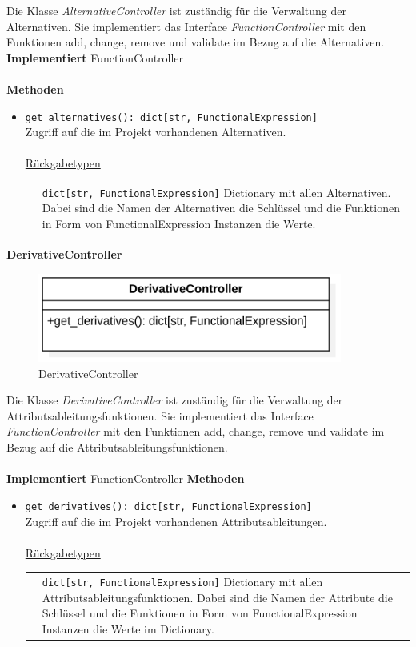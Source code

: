 \documentclass{article}
\begin{document}
Die Klasse \textit{AlternativeController} ist zuständig für die Verwaltung der Alternativen. Sie implementiert das Interface \textit{FunctionController} mit den Funktionen add, change, remove und validate im Bezug auf die Alternativen.
\newline\newline
\textbf{\large{Implementiert}} FunctionController \\\\
\textbf{\large{Methoden}}
\begin{itemize}
\item \texttt{get\_alternatives(): dict[str, FunctionalExpression]}\\ Zugriff auf die im Projekt vorhandenen Alternativen.\\\\
\underline{{Rückgabetypen}}\\
\begin{tabular}{lp{10.7cm}}
 & \texttt{dict[str, FunctionalExpression]}  Dictionary mit allen Alternativen. Dabei sind die Namen der Alternativen die Schlüssel und die Funktionen in Form von FunctionalExpression Instanzen die Werte.\\
\end{tabular}
\end{itemize}


\newpage
\textbf{\large{DerivativeController}}
\begin{figure}[H]%
    \centering
    \includegraphics[width=10cm]{entwurf/Floriane/DerivativeController.png}
    \caption{DerivativeController}
\end{figure}

Die Klasse \textit{DerivativeController} ist zuständig für die Verwaltung der Attributsableitungsfunktionen. Sie implementiert das Interface \textit{FunctionController} mit den Funktionen add, change, remove und validate im Bezug auf die Attributsableitungsfunktionen.\\\\
\textbf{\large{Implementiert}} FunctionController 
\textbf{\large{Methoden}}
\begin{itemize}
\item \texttt{get\_derivatives(): dict[str, FunctionalExpression]}\\ Zugriff auf die im Projekt vorhandenen Attributsableitungen.\\\\
\underline{{Rückgabetypen}}\\
\begin{tabular}{lp{10.7cm}}
 & \texttt{dict[str, FunctionalExpression]}  Dictionary mit allen Attributsableitungsfunktionen. Dabei sind die Namen der Attribute die Schlüssel und die Funktionen in Form von FunctionalExpression Instanzen die Werte im Dictionary.\\
\end{tabular}
\end{itemize}
\end{document}
